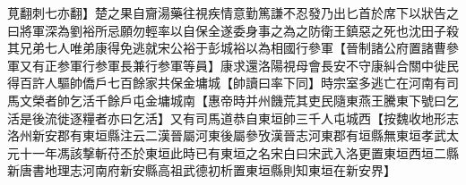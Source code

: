 莧翻刺七亦翻】楚之果自齎湯藥往視疾情意勤篤謙不忍發乃出匕首於席下以狀告之曰將軍深為劉裕所忌願勿輕率以自保全遂委身事之為之防衛王鎮惡之死也沈田子殺其兄弟七人唯弟康得免逃就宋公裕于彭城裕以為相國行參軍【晉制諸公府置諸曹參軍又有正参軍行参軍長兼行参軍等員】康求還洛陽視母會長安不守康糾合關中徙民得百許人驅帥僑戶七百餘家共保金墉城【帥讀曰率下同】時宗室多逃亡在河南有司馬文榮者帥乞活千餘戶屯金墉城南【惠帝時并州饑荒其吏民隨東燕王騰東下號曰乞活是後流徙逐糧者亦曰乞活】又有司馬道恭自東垣帥三千人屯城西【按魏收地形志洛州新安郡有東垣縣注云二漢晉屬河東後屬參攷漢晉志河東郡有垣縣無東垣孝武太元十一年馮該撃斬苻丕於東垣此時已有東垣之名宋白曰宋武入洛更置東垣西垣二縣新唐書地理志河南府新安縣高祖武德初析置東垣縣則知東垣在新安界】